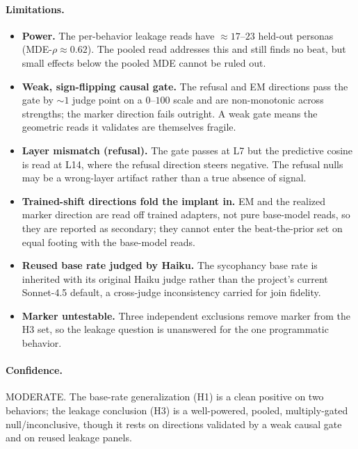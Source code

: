 \documentclass[11pt]{article}
\let\mathrho\rho
\renewcommand{\rho}{\ensuremath{\mathrho}}
\begin{document}
\paragraph{Limitations.}
\begin{itemize}[leftmargin=1.4em,topsep=2pt,itemsep=2pt]
  \item \textbf{Power.} The per-behavior leakage reads have $\approx 17$--$23$ held-out
  personas (MDE-$\rho \approx 0.62$). The pooled read addresses this and still finds no
  beat, but small effects below the pooled MDE cannot be ruled out.
  \item \textbf{Weak, sign-flipping causal gate.} The refusal and EM directions pass the
  gate by $\sim1$ judge point on a $0$--$100$ scale and are non-monotonic across strengths;
  the marker direction fails outright. A weak gate means the geometric reads it validates
  are themselves fragile.
  \item \textbf{Layer mismatch (refusal).} The gate passes at L7 but the predictive cosine
  is read at L14, where the refusal direction steers negative. The refusal nulls may be a
  wrong-layer artifact rather than a true absence of signal.
  \item \textbf{Trained-shift directions fold the implant in.} EM and the realized marker
  direction are read off trained adapters, not pure base-model reads, so they are reported
  as secondary; they cannot enter the beat-the-prior set on equal footing with the
  base-model reads.
  \item \textbf{Reused base rate judged by Haiku.} The sycophancy base rate is inherited
  with its original Haiku judge rather than the project's current Sonnet-4.5 default, a
  cross-judge inconsistency carried for join fidelity.
  \item \textbf{Marker untestable.} Three independent exclusions remove marker from the
  H3 set, so the leakage question is unanswered for the one programmatic behavior.
\end{itemize}

\paragraph{Confidence.} MODERATE. The base-rate generalization (H1) is a clean positive
on two behaviors; the leakage conclusion (H3) is a well-powered, pooled, multiply-gated
null/inconclusive, though it rests on directions validated by a weak causal gate and on
reused leakage panels.



\end{document}

